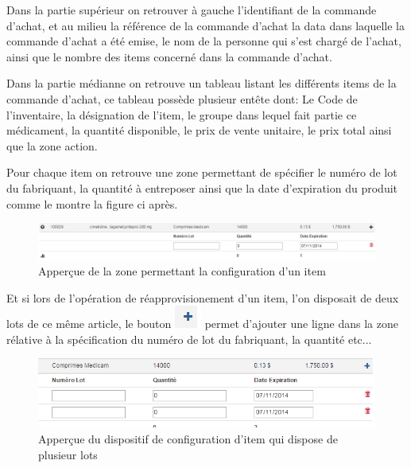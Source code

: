 \documentclass[12pt,a4paper]{report}
\begin{document}
\newpage

Dans la partie supérieur on retrouver à gauche l'identifiant de la commande d'achat, et au milieu la référence de la commande d'achat la data dans laquelle la commande d'achat a été emise, le nom de la personne qui s'est chargé de l'achat, ainsi que le nombre des items concerné dans la commande d'achat.

Dans la partie médianne on retrouve un tableau listant les différents items de la commande d'achat, ce tableau possède plusieur entête dont: Le Code de l'inventaire, la désignation de l'item, le groupe dans lequel fait partie ce médicament, la quantité disponible, le prix de vente unitaire, le prix total ainsi que la zone action.

Pour chaque item on retrouve une zone permettant de spécifier le numéro de lot du fabriquant, la quantité à entreposer ainsi que la date d'expiration du produit comme le montre la figure ci après.

\begin{figure}[h]
\begin{center}
\includegraphics[width=12cm]{pic/illustrationStock.png}
\end{center}
\caption{Apperçue de la zone permettant la configuration d'un item}
\label{Apperçue de la zone permettant la configuration d'un item}
\end{figure}

Et si lors de l'opération de réapprovisionement d'un item, l'on disposait de deux lots de ce même article, le bouton \includegraphics[scale=0.7]{pic/PlusGray.png} permet d'ajouter une ligne dans la zone rélative à la spécification du numéro de lot du fabriquant, la quantité etc...

\begin{figure}[h]
\begin{center}
\includegraphics[width=12cm]{pic/ForAddPlus.png}
\end{center}
\caption{Apperçue du dispositif de configuration d'item qui dispose de plusieur lots}
\label{Apperçue du dispositif de configuration d'item qui dispose de plusieur lots}
\end{figure}
\end{document}
